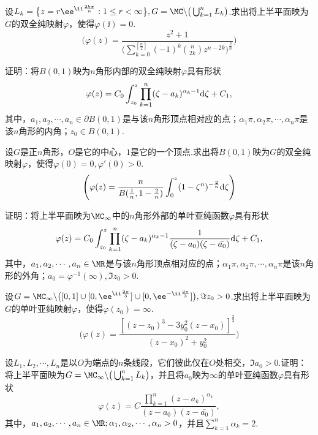 \begin{xiti}
\item 设$L_k=\big\{z=r\ee^{\ii\frac{2k\pi}n}:1\le r<\infty\big\},G=\MC\backslash
\big(\bigcup_{k=1}^nL_k\big)$.求出将上半平面映为$G$的双全纯映射$\varphi$，使得$\varphi(\ii)=0$.
\[\Bigg(\varphi(z)=\frac{z^2+1}{\bigg(\sum_{k=0}^{[\frac n2]}
(-1)^k\binom n{2k}z^{n-2k}\bigg)^{\frac2n}}\Bigg)\]
\item 证明：将$B(0,1)$映为$n$角形内部的双全纯映射$\varphi$具有形状
\[\varphi(z)=C_0\int_{z_0}^z\prod_{k=1}^n(\zeta-a_k)^{\alpha_k-1}\textrm d\zeta+C_1,\]
其中，$a_1,a_2,\cdots,a_n\in\partial B(0,1)$是与该$n$角形顶点相对应的点；$\alpha_1\pi,\alpha_2\pi,\cdots,\alpha_n\pi$是该$n$角形的内角；$z_0\in B(0,1)$.
\item 设$G$是正$n$角形，$O$是它的中心，$1$是它的一个顶点.求出将$B(0,1)$映为$G$的双全纯映射$\varphi$，使得$\varphi(0)=0,\varphi'(0)>0$.
\[\Bigg(\varphi(z)=\frac n{B(\frac1n,1-\frac2n)}\int_0^z(1-\zeta^n)^{-\frac2n}\textrm d\zeta\Bigg)\]
\item 证明：将上半平面映为$\MC_\infty$中的$n$角形外部的单叶亚纯函数$\varphi$具有形状
\[\varphi(z)=C_0\int_{z_0}^z\prod_{k=1}^n(\zeta-a_k)^{\alpha_k-1}
\frac1{(\zeta-a_0)(\zeta-\bar{a_0})}\textrm d\zeta+C_1,\]
其中，$a_1,a_2,\cdots,a_n\in\MR$是与该$n$角形顶点相对应的点；$\alpha_1\pi,\alpha_2\pi,\cdots,\alpha_n\pi$是该$n$角形的外角；$a_0=\varphi^{-1}(\infty),\Im z_0>0$.
\item 设$G=\MC_\infty\backslash\big([0,1]\cup[0,\ee^{\ii\frac{2\pi}3}]\cup
[0,\ee^{-\ii\frac{2\pi}3}]\big),\Im z_0>0$.求出将上半平面映为$G$的单叶亚纯映射$\varphi$，使得$\varphi(z_0)=\infty$.
\[\bigg(\varphi(z)=\frac{[(z-z_0)^3-3y_0^2(z-x_0)]^{\frac23}}{(z-x_0)^2+y_0^2}\bigg)\]
\item 设$L_1,L_2,\cdots,L_n$是以$O$为端点的$n$条线段，它们彼此仅在$O$处相交，$\Im a_0>0$.证明：将上半平面映为$G=\MC_\infty\backslash\big(\bigcup_{k=1}^n
    L_k\big)$，并且将$a_0$映为$\infty$的单叶亚纯函数$\varphi$具有形状
\[\varphi(z)=C\frac{\prod_{k=1}^n(z-a_k)^{\alpha_k}}{(z-a_0)(z-\bar{a_0})},\]
其中，$a_1,a_2,\cdots,a_n\in\MR;\alpha_1,\alpha_2,\cdots,\alpha_n>0$，并且$\sum_{k=1}^n\alpha_k=2$.

\end{xiti}
